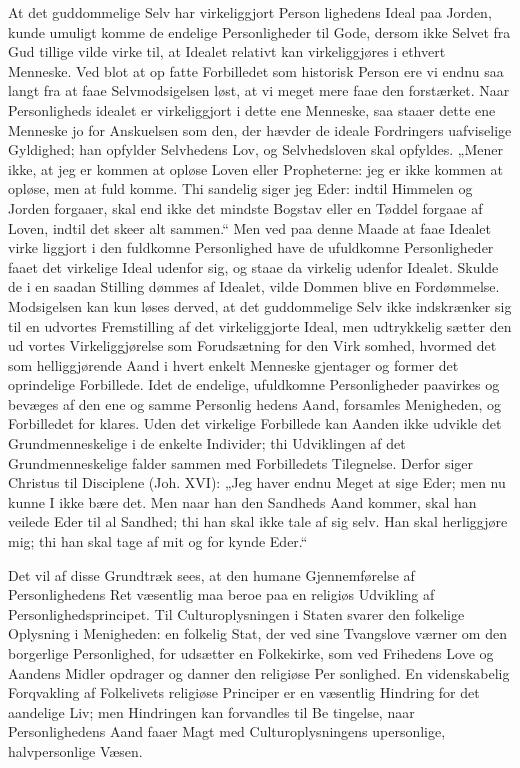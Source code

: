 \documentclass[12pt]{book}
\newcommand{\opage}[1]{\marginnote{\footnotesize\textit{[#1]}}}
\begin{document}
At det guddommelige Selv har virkeliggjort Person\-%
lighedens Ideal paa Jorden, kunde umuligt komme de
endelige Personligheder til Gode, dersom ikke Selvet
fra Gud tillige vilde virke til, at Idealet relativt kan
virkeliggjøres i ethvert Menneske. Ved blot at op\-%
fatte Forbilledet som historisk Person ere vi endnu
saa langt fra at faae Selvmodsigelsen løst, at vi
meget mere faae den forstærket. Naar Personligheds\-%
idealet er virkeliggjort i dette ene Menneske, saa staaer
dette ene Menneske jo for Anskuelsen som den, der
hævder de ideale Fordringers uafviselige Gyldighed; han
opfylder Selvhedens Lov, og Selvhedsloven skal opfyldes.
„Mener ikke, at jeg er kommen at opløse Loven eller
Propheterne: jeg er ikke kommen at opløse, men at fuld\-%
komme. Thi sandelig siger jeg Eder: indtil Himmelen
og Jorden forgaaer, skal end ikke det mindste Bogstav
eller en Tøddel forgaae af Loven, indtil det skeer alt\-%
sammen.“ Men ved paa denne Maade at faae Idealet virke\-%
liggjort i den fuldkomne Personlighed have de ufuldkomne
Personligheder faaet det virkelige Ideal udenfor sig, og staae
da virkelig udenfor Idealet. Skulde de i en saadan Stilling
dømmes af Idealet, vilde Dommen blive en Fordømmelse.
Modsigelsen kan kun løses derved, at det guddommelige
\opage{153}\setcounter{footnote}{0}%
Selv ikke indskrænker sig til en udvortes Fremstilling af
det virkeliggjorte Ideal, men udtrykkelig sætter den ud\-%
vortes Virkeliggjørelse som Forudsætning for den Virk\-%
somhed, hvormed det som helliggjørende Aand i hvert
enkelt Menneske gjentager og former det oprindelige
Forbillede. Idet de endelige, ufuldkomne Personligheder
paavirkes og bevæges af den ene og samme Personlig\-%
hedens Aand, forsamles Menigheden, og Forbilledet for\-%
klares. Uden det virkelige Forbillede kan Aanden ikke
udvikle det Grundmenneskelige i de enkelte Individer;
thi Udviklingen af det Grundmenneskelige falder sammen
med Forbilledets Tilegnelse. Derfor siger Christus til
Disciplene (Joh. XVI): „Jeg haver endnu Meget at
sige Eder; men nu kunne I ikke bære det. Men naar
han den Sandheds Aand kommer, skal han veilede Eder
til al Sandhed; thi han skal ikke tale af sig selv. Han
skal herliggjøre mig; thi han skal tage af mit og for\-%
kynde Eder.“

Det vil af disse Grundtræk sees, at den humane
Gjennemførelse af Personlighedens Ret væsentlig maa
beroe paa en religiøs Udvikling af Personlighedsprincipet.
Til Culturoplysningen i Staten svarer den folkelige
Oplysning i Menigheden: en folkelig Stat, der ved sine
Tvangslove værner om den borgerlige Personlighed, for\-%
udsætter en Folkekirke, som ved Frihedens Love og
Aandens Midler opdrager og danner den religiøse Per\-%
sonlighed. En videnskabelig Forqvakling af Folkelivets
religiøse Principer er en væsentlig Hindring for det
aandelige Liv; men Hindringen kan forvandles til Be\-%
tingelse, naar Personlighedens Aand faaer Magt med
Culturoplysningens upersonlige, halvpersonlige Væsen.
\end{document}
